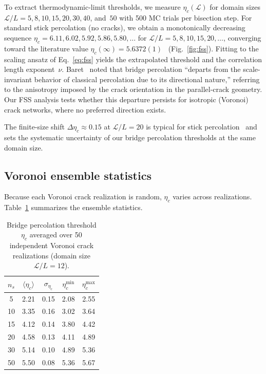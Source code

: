 To extract thermodynamic-limit thresholds, we measure
$\eta_c(\mathcal{L})$ for domain sizes
$\mathcal{L}/L = 5, 8, 10, 15, 20, 30, 40$, and~$50$
with 500 MC trials per bisection step.
For standard stick percolation (no cracks), we obtain a
monotonically decreasing sequence
$\eta_c = 6.11, 6.02, 5.92, 5.86, 5.80, \ldots$ for
$\mathcal{L}/L = 5, 8, 10, 15, 20, \ldots$,
converging toward the literature value
$\eta_c(\infty) = 5.6372(1)$~\cite{Li2009}
(Fig.~\ref{fig:fss}).
Fitting to the scaling ansatz of Eq.~\eqref{eq:fss}
yields the extrapolated threshold and the correlation length
exponent~$\nu$.
Baret~\cite{Baret2025} noted that bridge percolation
``departs from the scale-invariant behavior of classical
percolation due to its directional nature,'' referring to
the anisotropy imposed by the crack orientation in the
parallel-crack geometry.
Our FSS analysis tests whether this departure persists
for isotropic (Voronoi) crack networks, where no preferred
direction exists.

The finite-size shift $\Delta\eta_c \approx 0.15$ at
$\mathcal{L}/L = 20$ is typical for stick
percolation~\cite{Li2009} and sets the systematic uncertainty
of our bridge percolation thresholds at the same domain size.

\subsection{Voronoi ensemble statistics}

Because each Voronoi crack realization is random,
$\eta_c$ varies across realizations.
Table~\ref{tab:ensemble} summarizes the ensemble statistics.

\begin{table}[t]
\caption{\label{tab:ensemble}%
Bridge percolation threshold $\eta_c$ averaged over
50 independent Voronoi crack realizations
(domain size $\mathcal{L}/L = 12$).
}
\begin{ruledtabular}
\begin{tabular}{ccccc}
$n_s$ & $\langle\eta_c\rangle$ & $\sigma_{\eta_c}$ &
$\eta_c^{\min}$ & $\eta_c^{\max}$ \\
\hline
5  & 2.21 & 0.15 & 2.08 & 2.55 \\
10 & 3.35 & 0.16 & 3.02 & 3.64 \\
15 & 4.12 & 0.14 & 3.80 & 4.42 \\
20 & 4.58 & 0.13 & 4.11 & 4.89 \\
30 & 5.14 & 0.10 & 4.89 & 5.36 \\
50 & 5.50 & 0.08 & 5.36 & 5.67 \\
\end{tabular}
\end{ruledtabular}
\end{table}

